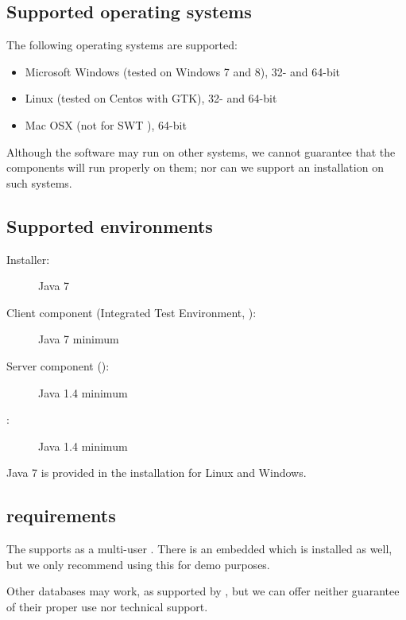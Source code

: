 
\subsection{Supported operating systems}
The following operating systems are supported:
\begin{itemize}
  \item Microsoft Windows (tested on Windows 7 and 8), 32- and 64-bit
  \item  Linux (tested on Centos with GTK), 32- and 64-bit
  \item Mac OSX (not for SWT \gdauts{}), 64-bit 

\end{itemize}

Although the software may run on other systems, we cannot guarantee that the components will run properly on them; nor can we support an installation on such systems.

\subsection{Supported  environments}
\begin{description}
\item [Installer:]{Java 7}
\item [Client component (Integrated Test Environment, \ite{}):]{Java 7 minimum}
\item [Server component (\gdagent):]{Java 1.4 minimum}
\item [\gdaut{}:]{Java 1.4 minimum}
\end{description}
Java 7 is provided in the  installation for Linux and Windows.

 

\subsection{\gdDB requirements}
The \ite{} supports   as a multi-user \gddb{}. There is an embedded \gddb{} which is installed as well, but we only recommend using this for demo purposes. 

Other databases may work, as supported by , but we can offer neither guarantee of their proper use nor technical support. 

